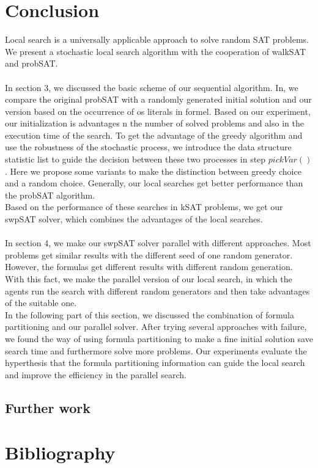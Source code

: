\documentclass[12pt,a4paper,twoside]{scrartcl}
\numberwithin{equation}{section}
\begin{document}
\section{Conclusion}

\label{sec:conc}
Local search is a universally applicable approach to solve random SAT problems. We present a stochastic local search algorithm with the cooperation of walkSAT and probSAT.\\
\\
In section 3, we discussed the basic scheme of our sequential algorithm. In, we compare the original probSAT with a randomly generated initial solution and our version based on the occurrence of os literals in formel. Based on our experiment, our initialization is advantages n the number of solved problems and also in the execution time of the search. To get the advantage of the greedy algorithm and use the robustness of the stochastic process, we introduce the data structure statistic list to guide the decision between these two processes in step $pickVar()$. Here we propose some variants to make the distinction between greedy choice and a random choice. Generally, our local searches get better performance than the probSAT algorithm. \\
Based on the performance of these searches in kSAT problems, we get our swpSAT solver, which combines the advantages of the local searches. \\
\\
In section 4, we make our swpSAT solver parallel with different approaches. Most problems get similar results with the different seed of one random generator. However, the formulas get different results with different random generation. With this fact, we make the parallel version of our local search, in which the agents run the search with different random generators and then take advantages of the suitable one.\\
In the following part of this section, we discussed the combination of formula partitioning and our parallel solver. After trying several approaches with failure, we found the way of using formula partitioning to make a fine initial solution save search time and furthermore solve more problems. Our experiments evaluate the hyperthesis that the formula partitioning information can guide the local search and improve the efficiency in the parallel search.
\subsection{Further work}
\clearpage
\section{Bibliography}


\end{document}
